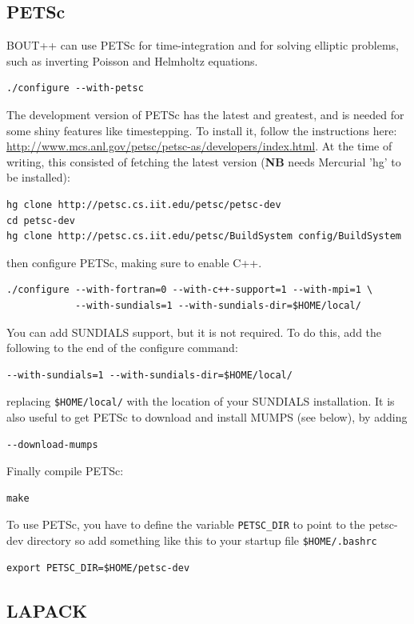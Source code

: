 \documentclass[12pt]{article}
\begin{document}
\subsection{PETSc}

BOUT++ can use PETSc for time-integration and for solving elliptic problems, such as inverting
Poisson and Helmholtz equations.
\begin{verbatim}
./configure --with-petsc
\end{verbatim}

The development version of PETSc has the latest and greatest, and is needed for some 
shiny features like timestepping. To install it, follow the instructions here:
\url{http://www.mcs.anl.gov/petsc/petsc-as/developers/index.html}. At the time of
writing, this consisted of fetching the latest version ({\bf NB} needs Mercurial 
'hg' to be installed):
\begin{verbatim}
hg clone http://petsc.cs.iit.edu/petsc/petsc-dev
cd petsc-dev
hg clone http://petsc.cs.iit.edu/petsc/BuildSystem config/BuildSystem
\end{verbatim}

then configure PETSc, making sure to enable C++. 
\begin{verbatim}
./configure --with-fortran=0 --with-c++-support=1 --with-mpi=1 \
            --with-sundials=1 --with-sundials-dir=$HOME/local/
\end{verbatim}
You can add SUNDIALS support, but it is not required. To do this, add the following
to the end of the configure command:
\begin{verbatim}
--with-sundials=1 --with-sundials-dir=$HOME/local/
\end{verbatim}
replacing \texttt{\$HOME/local/} with the location of your SUNDIALS installation.
It is also useful to get PETSc to download and install MUMPS (see below), by adding
\begin{verbatim}
--download-mumps
\end{verbatim}

Finally compile PETSc:
\begin{verbatim}
make
\end{verbatim}
To use PETSc, you have to define the variable \texttt{PETSC\_DIR} to point to the petsc-dev directory so add something
like this to your startup file \texttt{\$HOME/.bashrc}
\begin{verbatim}
export PETSC_DIR=$HOME/petsc-dev
\end{verbatim}

\subsection{LAPACK}
\end{document}
